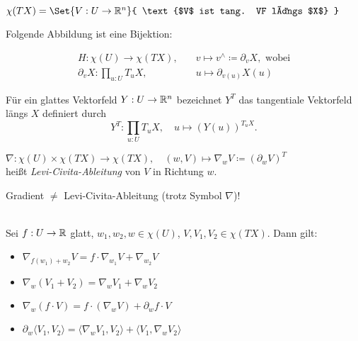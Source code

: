 \documentclass{cheat-sheet}
\begin{document}
\begin{nota}
  $\chi(TX) = \Set{ V : U \to \R^n }{ \text{$V$ ist tang. VF längs $X$} }$
\end{nota}

\begin{bem}
  Folgende Abbildung ist eine Bijektion:

  \begin{align*}
     H : \chi(U) \to \chi(TX), \quad &v \mapsto v^{\wedge} \coloneqq \partial_v X, \text{ wobei}\\
     \partial_v X : \prod_{u : U} T_u X, \quad &u \mapsto \partial_{v(u)} X(u)
   \end{align*} 
\end{bem}

\begin{nota}
  Für ein glattes Vektorfeld $Y : U \to \mathbb{R}^n$ bezeichnet $Y^T$ das tangentiale Vektorfeld längs $X$ definiert durch
  \[ Y^T : \prod_{u : U} T_u X, \quad u \mapsto (Y(u))^{T_u X}. \]
\end{nota}

\begin{defn}
  $\nabla : \chi(U) \times \chi(TX) \to \chi(TX), \quad (w, V) \mapsto \nabla_w V \coloneqq (\partial_w V)^T$\\
  heißt \emph{Levi-Civita-Ableitung} von $V$ in Richtung $w$.
\end{defn}

\begin{acht}
  Gradient $\not=$ Levi-Civita-Ableitung (trotz Symbol $\nabla$)!
\end{acht}

\begin{satz}\mbox{}\\
  Sei $f : U \to \mathbb{R}$ glatt, $w_1, w_2, w \in \chi(U)$, $V, V_1, V_2 \in \chi(TX)$. Dann gilt:
  \begin{itemize}
    \item $\nabla_{f(w_1) + w_2} V = f \cdot \nabla_{w_1} V + \nabla_{w_2} V$ 
    \item $\nabla_w (V_1 + V_2) = \nabla_w V_1 + \nabla_w V_2$ 
    \item $\nabla_w (f \cdot V) = f \cdot (\nabla_w V) + \partial_w f \cdot V $ 
    \item $\partial_w \langle V_1, V_2 \rangle = \langle \nabla_w V_1 , V_2 \rangle + \langle V_1 , \nabla_w V_2 \rangle$ 
  \end{itemize}
\end{satz}
\end{document}
